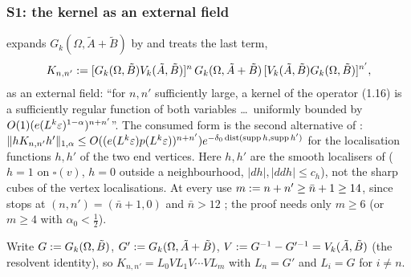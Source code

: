 
\subsubsection{S1: the kernel \cite[(1.16)]{Ba3} as an external field}\label{sup1:ssec:S1}

\cite[p.~414]{Ba3} expands $G_k(\Omega,\tilde A+\tilde B)$ by \cite[(3.44)--(3.45)]{Ba1} and treats the last term,
\begin{equation}\label{sup1:eq:116}
K_{n,n'}:=[G_k(\Omega,\tilde B)V_k(\tilde A,\tilde B)]^n\,G_k(\Omega,\tilde A+\tilde B)\,[V_k(\tilde A,\tilde B)G_k(\Omega,\tilde B)]^{n'},
\end{equation}
as an external field: ``for $n,n'$ sufficiently large, a kernel of the operator (1.16) is a sufficiently regular function of both variables \dots\ uniformly bounded by $O(1)(e(L^k\varepsilon)^{1-\alpha})^{n+n'}$''. The consumed form is the second alternative of \cite[(2.5)]{Ba3}: $\lVert hK_{n,n'}h'\rVert_{1,\alpha}\le O((e(L^k\varepsilon)p(L^k\varepsilon))^{n+n'})e^{-\delta_0\operatorname{dist}(\operatorname{supp} h,\operatorname{supp} h')}$ for the localisation functions $h,h'$ of the two end vertices. Here $h,h'$ are the smooth localisers of \cite[(1.33), p.~420]{Ba3} ($h=1$ on $\square(v)$, $h=0$ outside a neighbourhood, $|dh|,|ddh|\le c_h$), not the sharp cubes of the vertex localisations. At every use $m:= n+n'\ge\bar n+1\ge14$, since \cite[(3.45)]{Ba1} stops at $(n,n')=(\bar n+1,0)$ and $\bar n>12$ \cite[p.~421]{Ba3}; the proof needs only $m\ge6$ (or $m\ge4$ with $\alpha_0<\frac12$).

Write $G:= G_k(\Omega,\tilde B)$, $G':= G_k(\Omega,\tilde A+\tilde B)$, $V:= G^{-1}-G'^{-1}=V_k(\tilde A,\tilde B)$ (the resolvent identity), so $K_{n,n'}=L_0VL_1V\cdots VL_m$ with $L_n=G'$ and $L_i=G$ for $i\ne n$.

